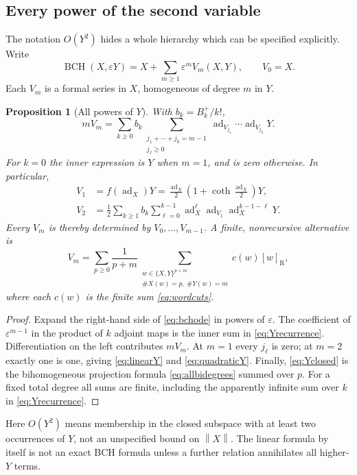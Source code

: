 \documentclass[11pt]{article}
\numberwithin{equation}{section}
\newtheorem{proposition}[proposition]{Proposition}
\theoremstyle{definition}
\theoremstyle{remark}
\DeclareMathOperator{\ad}{ad}
\DeclareMathOperator{\BCH}{BCH}
\newcommand{\eps}{\varepsilon}
\newcommand{\norm}[1]{\left\lVert#1\right\rVert}
\newcommand{\RB}[1]{[#1]_{\mathrm R}}
\begin{document}
\subsection{Every power of the second variable}
The notation $O(Y^2)$ hides a whole hierarchy which can be specified
explicitly. Write
\begin{equation}\label{eq:Yexpansion}
 \BCH(X,\eps Y)=X+\sum_{m\geq1}\eps^m V_m(X,Y),\qquad V_0=X.
\end{equation}
Each $V_m$ is a formal series in $X$, homogeneous of degree $m$ in $Y$.

\begin{proposition}[All powers of $Y$]\label{prop:Yall}
With $b_k=B_k^+/k!$,
\begin{equation}\label{eq:Yrecurrence}
 mV_m=\sum_{k\geq0}b_k
 \sum_{\substack{j_1+\cdots+j_k=m-1\\j_\ell\geq0}}
 \ad_{V_{j_1}}\cdots\ad_{V_{j_k}}Y.
\end{equation}
For $k=0$ the inner expression is $Y$ when $m=1$, and is zero
otherwise. In particular,
\begin{align}
 V_1&=f(\ad_X)Y
 =\frac{\ad_X}{2}\left(1+\coth\frac{\ad_X}{2}\right)Y,
 \label{eq:linearY}\\
 V_2&=\frac12\sum_{k\geq1}b_k\sum_{\ell=0}^{k-1}
 \ad_X^\ell\ad_{V_1}\ad_X^{k-1-\ell}Y.
 \label{eq:quadraticY}
\end{align}
Every $V_m$ is thereby determined by $V_0,\ldots,V_{m-1}$.
A finite, nonrecursive alternative is
\begin{equation}\label{eq:Yclosed}
 V_m=\sum_{p\geq0}\frac1{p+m}
 \sum_{\substack{w\in\{X,Y\}^{p+m}\\\#X(w)=p,\ \#Y(w)=m}}
 c(w)\RB{w},
\end{equation}
where each $c(w)$ is the finite sum \eqref{eq:wordcuts}.
\end{proposition}
\begin{proof}
Expand the right-hand side of \eqref{eq:bchode} in powers of $\eps$.
The coefficient of $\eps^{m-1}$ in the product of $k$ adjoint maps
is the inner sum in \eqref{eq:Yrecurrence}. Differentiation on the
left contributes $mV_m$. At $m=1$ every $j_\ell$ is zero; at $m=2$
exactly one is one, giving \eqref{eq:linearY} and
\eqref{eq:quadraticY}. Finally, \eqref{eq:Yclosed} is the
bihomogeneous projection formula \eqref{eq:allbidegrees} summed over
$p$. For a fixed total degree all sums are finite, including the
apparently infinite sum over $k$ in \eqref{eq:Yrecurrence}.
\end{proof}
Here $O(Y^2)$ means membership in the closed subspace with at least two
occurrences of $Y$, not an unspecified bound on $\norm{X}$. The linear
formula by itself is not an exact BCH formula unless a further relation
annihilates all higher-$Y$ terms.
\end{document}
